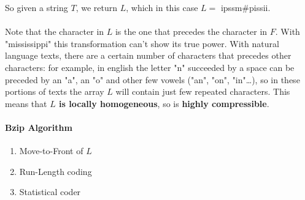 \documentclass[10pt]{report}
\begin{document}
So given a string $T$, we return $L$, which in this case $L=$ ipssm\#pissii.\\\\
Note that the character in $L$ is the one that precedes the character in $F$. With "mississippi" this transformation can't show its true power. With natural language texts, there are a certain number of characters that precedes other characters: for example, in english the letter "n" succeeded by a space can be preceded by an "a", an "o" and other few vowels ("an", "on", "in"\ldots), so in these portions of texts the array $L$ will contain just few repeated characters. This means that \textbf{$L$ is locally homogeneous}, so is \textbf{highly compressible}.
\paragraph{Bzip Algorithm}
\begin{enumerate}
	\item Move-to-Front of $L$
	\item Run-Length coding
	\item Statistical coder
\end{enumerate}
\end{document}
